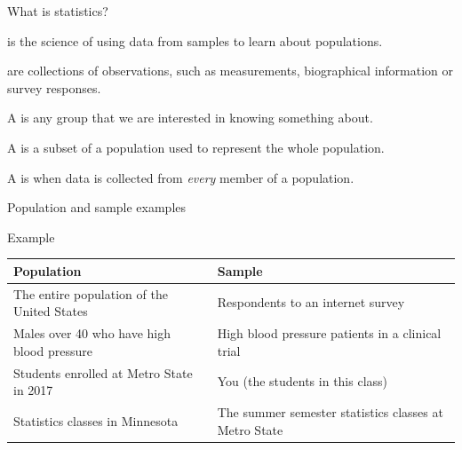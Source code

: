 \documentclass[xcolor=table, aspectratio=169, bigger, handout]{beamer}
\begin{document}
\begin{frame}{What is statistics?}

\begin{block}{}
 is the science of using data from samples to learn about populations.
\end{block}

\pause
\begin{block}{}
 are collections of observations, such as measurements, biographical information or survey responses.
\end{block}

\pause
\begin{block}{}
A  is any group that we are interested in knowing something about.
\end{block}

\pause
\begin{block}{}
A  is a subset of a population used to represent the whole population.
\end{block}

\pause
\begin{block}{}
A  is when data is collected from \emph{every} member of a population.
\end{block}


\end{frame}


\begin{frame}{Population and sample examples}

\begin{exampleblock}{Example}
\begin{center}
\tabspacemed
\begin{tabular}{p{2.5in} | p{2.5in} }
Population & Sample\\
\hline
The entire population of the United States & Respondents to an internet survey\pause\\
Males over 40 who have high blood pressure & High blood pressure patients in a clinical trial\pause\\

Students enrolled at Metro State in 2017 & You (the students in this class)\pause\\
Statistics classes in Minnesota & The summer semester statistics classes at Metro State\\
\end{tabular}
\end{center}
\end{exampleblock}

\end{frame}
\end{document}
